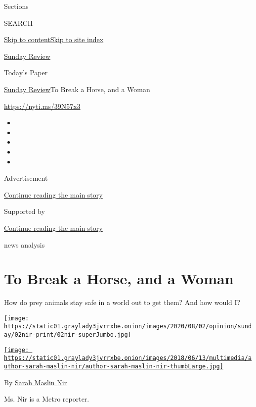 Sections

SEARCH

\protect\hyperlink{site-content}{Skip to
content}\protect\hyperlink{site-index}{Skip to site index}

\href{https://www.nytimes3xbfgragh.onion/section/opinion/sunday}{Sunday
Review}

\href{https://myaccount.nytimes3xbfgragh.onion/auth/login?response_type=cookie\&client_id=vi}{}

\href{https://www.nytimes3xbfgragh.onion/section/todayspaper}{Today's
Paper}

\href{/section/opinion/sunday}{Sunday Review}\textbar{}To Break a Horse,
and a Woman

\url{https://nyti.ms/39N57x3}

\begin{itemize}
\item
\item
\item
\item
\item
\end{itemize}

Advertisement

\protect\hyperlink{after-top}{Continue reading the main story}

Supported by

\protect\hyperlink{after-sponsor}{Continue reading the main story}

news analysis

\hypertarget{to-break-a-horse-and-a-woman}{%
\section{To Break a Horse, and a
Woman}\label{to-break-a-horse-and-a-woman}}

How do prey animals stay safe in a world out to get them? And how would
I?

\texttt{[image: https://static01.graylady3jvrrxbe.onion/images/2020/08/02/opinion/sunday/02nir-print/02nir-superJumbo.jpg]}

\href{https://www.nytimes3xbfgragh.onion/by/sarah-maslin-nir}{\texttt{[image: https://static01.graylady3jvrrxbe.onion/images/2018/06/13/multimedia/author-sarah-maslin-nir/author-sarah-maslin-nir-thumbLarge.jpg]}}

By \href{https://www.nytimes3xbfgragh.onion/by/sarah-maslin-nir}{Sarah
Maslin Nir}

Ms. Nir is a Metro reporter.

